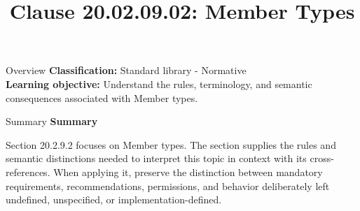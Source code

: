 \documentclass[10pt,letterpaper]{article}
\title{Clause 20.02.09.02: Member Types}
\author{}
\date{}
\begin{document}
\maketitle
\begin{CornellOverviewBox}{Overview}
\textbf{Classification:} Standard library - Normative\\[2pt]
\textbf{Learning objective:} Understand the rules, terminology, and semantic consequences associated with Member types.
\end{CornellOverviewBox}\begin{CornellSummaryBox}{Summary}
{\sffamily\bfseries\color{Accent} Summary}\par\vspace{3pt}Section 20.2.9.2 focuses on Member types. The section supplies the rules and semantic distinctions needed to interpret this topic in context with its cross-references. When applying it, preserve the distinction between mandatory requirements, recommendations, permissions, and behavior deliberately left undefined, unspecified, or implementation-defined.
\end{CornellSummaryBox}
\end{document}

